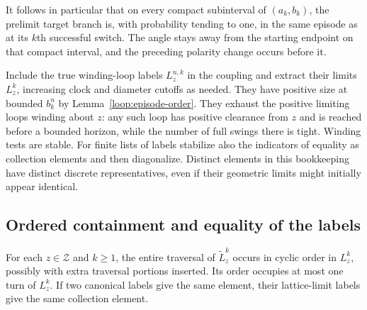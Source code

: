 It follows in particular that on every compact subinterval of
$(a_k,b_k)$, the prelimit target branch is, with probability tending
to one, in the same episode as at its $k$th successful switch.  The
angle stays away from the starting endpoint on that compact interval,
and the preceding polarity change occurs before it.

Include the true winding-loop labels $L_z^{n,k}$ in the coupling and
extract their limits $L_z^k$, increasing clock and diameter cutoffs
as needed.  They have positive size at bounded $b_k^n$ by
Lemma~\ref{loop:episode-order}.  They exhaust the positive limiting
loops winding about $z$: any such loop has positive clearance from
$z$ and is reached before a bounded horizon, while the number of full
swings there is tight.  Winding tests are stable.  For finite lists of
labels stabilize also the indicators of equality as collection
elements and then diagonalize.  Distinct elements in this bookkeeping
have distinct discrete representatives, even if their geometric limits
might initially appear identical.

\subsection{Ordered containment and equality of the labels}
\label{loop:matching}

\begin{lemma}
\label{loop:ordered}
For each $z\in\mathcal Z$ and $k\ge1$, the entire traversal of
$\widetilde L_z^k$ occurs in cyclic order in $L_z^k$, possibly with
extra traversal portions inserted.  Its order occupies at most one
turn of $L_z^k$.  If two canonical labels give the same element, their
lattice-limit labels give the same collection element.
\end{lemma}

